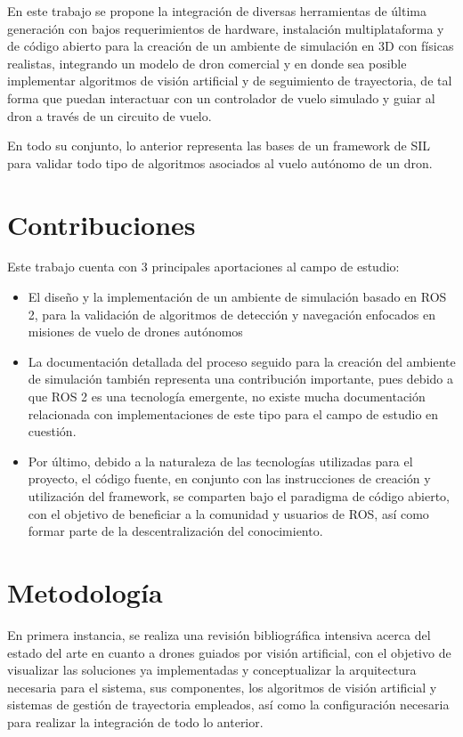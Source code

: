 En este trabajo se propone la integración de diversas herramientas de última generación con bajos requerimientos de hardware, instalación multiplataforma y de código abierto para la creación de un ambiente de simulación en 3D con físicas realistas, integrando un modelo de dron comercial y en donde sea posible implementar algoritmos de visión artificial y de seguimiento de trayectoria, de tal forma que puedan interactuar con un controlador de vuelo simulado y guiar al dron a través de un circuito de vuelo.    

En todo su conjunto, lo anterior representa las bases de un framework de SIL para validar todo tipo de algoritmos asociados al vuelo autónomo de un dron.

\section{Contribuciones}

Este trabajo cuenta con 3 principales aportaciones al campo de estudio:

\begin{itemize}
    \item El diseño y la implementación de un ambiente de simulación basado en ROS 2, para la validación de algoritmos de detección y navegación enfocados en misiones de vuelo de drones autónomos
    \item La documentación detallada del proceso seguido para la creación del ambiente de simulación también representa una contribución importante, pues debido a que ROS 2 es una tecnología emergente, no existe mucha documentación relacionada con implementaciones de este tipo para el campo de estudio en cuestión.
    \item Por último, debido a la naturaleza de las tecnologías utilizadas para el proyecto, el código fuente, en conjunto con las instrucciones de creación y utilización del framework, se comparten bajo el paradigma de código abierto, con el objetivo de beneficiar a la comunidad y usuarios de ROS, así como formar parte de la descentralización del conocimiento.
\end{itemize}


\section{Metodología}

En primera instancia, se realiza una revisión bibliográfica intensiva acerca del estado del arte en cuanto a drones guiados por visión artificial, con el objetivo de visualizar las soluciones ya implementadas y conceptualizar la arquitectura necesaria para el sistema, sus componentes, los algoritmos de visión artificial y sistemas de gestión de trayectoria empleados, así como la configuración necesaria para realizar la integración de todo lo anterior.


